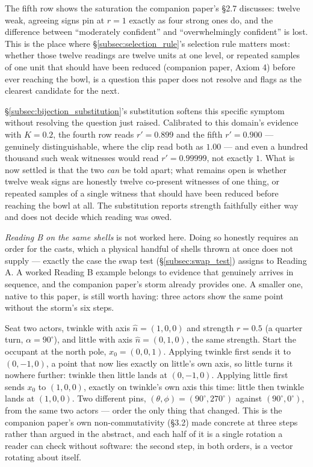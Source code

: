 \documentclass[12pt, a4paper]{article}
\begin{document}
The fifth row shows the saturation the companion paper's \S2.7
discusses: twelve weak, agreeing signs pin at $r=1$ exactly as four
strong ones do, and the difference between ``moderately confident''
and ``overwhelmingly confident'' is lost. This is the place where
\S\ref{subsec:selection_rule}'s selection rule matters most: whether
those twelve readings are twelve units at one level, or repeated
samples of one unit that should have been reduced (companion paper,
Axiom 4) before ever reaching the bowl, is a question this paper does
not resolve and flags as the clearest candidate for the next.

\S\ref{subsec:bijection_substitution}'s substitution softens this
specific symptom without resolving the question just raised.
Calibrated to this domain's evidence with $K=0.2$, the fourth row
reads $r'=0.899$ and the fifth $r'=0.900$ --- genuinely
distinguishable, where the clip read both as $1.00$ --- and even a
hundred thousand such weak witnesses would read $r'=0.99999$, not
exactly $1$. What is now settled is that the two \emph{can} be told
apart; what remains open is whether twelve weak signs are honestly
twelve co-present witnesses of one thing, or repeated samples of a
single witness that should have been reduced before reaching the bowl
at all. The substitution reports strength faithfully either way and
does not decide which reading was owed.

\emph{Reading B on the same shells} is not worked here. Doing so
honestly requires an order for the casts, which a physical handful of
shells thrown at once does not supply --- exactly the case the swap
test (\S\ref{subsec:swap_test}) assigns to Reading A. A worked Reading
B example belongs to evidence that genuinely arrives in sequence, and
the companion paper's storm already provides one. A smaller one,
native to this paper, is still worth having: three actors show the
same point without the storm's six steps.

Seat two actors, $\mathrm{twinkle}$ with axis $\hat n=(1,0,0)$ and
strength $r=0.5$ (a quarter turn, $\alpha=90^\circ$), and
$\mathrm{little}$ with axis $\hat n=(0,1,0)$, the same strength.
Start the occupant at the north pole, $x_0=(0,0,1)$. Applying
$\mathrm{twinkle}$ first sends it to $(0,-1,0)$, a point that now
lies exactly on $\mathrm{little}$'s own axis, so $\mathrm{little}$
turns it nowhere further: $\mathrm{twinkle}$ then $\mathrm{little}$
lands at $(0,-1,0)$. Applying $\mathrm{little}$ first sends $x_0$ to
$(1,0,0)$, exactly on $\mathrm{twinkle}$'s own axis this time:
$\mathrm{little}$ then $\mathrm{twinkle}$ lands at $(1,0,0)$. Two
different pins, $(\theta,\phi)=(90^\circ,270^\circ)$ against
$(90^\circ,0^\circ)$, from the same two actors --- order the only
thing that changed. This is the companion paper's own
non-commutativity (\S3.2) made concrete at three steps rather than
argued in the abstract, and each half of it is a single rotation a
reader can check without software: the second step, in both orders,
is a vector rotating about itself.
\end{document}
